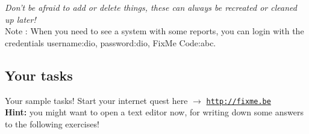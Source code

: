 \documentclass[12pt]{article}
\begin{document}
\textit{Don't be afraid to add or delete things, these can always be recreated or cleaned up later!}\\

Note : When you need to see a system with some reports, you can login with the credentials username:dio, password:dio, FixMe Code:abc.

\pagebreak
\subsection{Your tasks}
Your sample tasks! Start your internet quest here $\rightarrow$  \href{http://fixme.be}{\texttt{http://fixme.be}}\\
\textbf{Hint:} you might want to open a text editor now, for writing down some answers to the following exercises!
\end{document}
